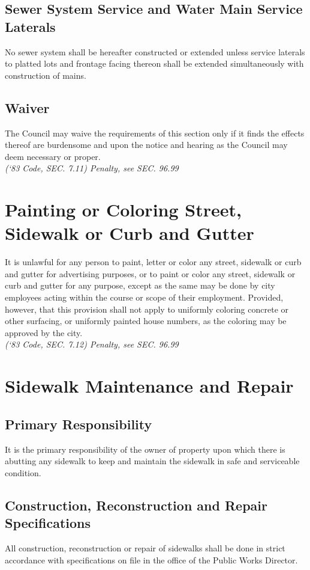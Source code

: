 \subsection{Sewer System Service and Water Main Service Laterals}
No sewer system shall be hereafter constructed or extended unless service laterals to platted lots and frontage facing thereon shall be extended simultaneously with construction of mains.
\subsection{Waiver}
The Council may waive the requirements of this section only if it finds the effects thereof are burdensome and upon the notice and hearing as the Council may deem necessary or proper.\\
\emph{(‘83 Code, SEC. 7.11)  Penalty, see SEC. 96.99}
\section{Painting or Coloring Street, Sidewalk or Curb and Gutter}
It is unlawful for any person to paint, letter or color any street, sidewalk or curb and gutter for advertising purposes, or to paint or color any street, sidewalk or curb and gutter for any purpose, except as the same may be done by city employees acting within the course or scope of their employment. Provided, however, that this provision shall not apply to uniformly coloring concrete or other surfacing, or uniformly painted house numbers, as the coloring may be approved by the city.\\
\emph{(‘83 Code, SEC. 7.12)  Penalty, see SEC. 96.99}
\section{Sidewalk Maintenance and Repair}
\subsection{Primary Responsibility}
It is the primary responsibility of the owner of property upon which there is abutting any sidewalk to keep and maintain the sidewalk in safe and serviceable condition.
\subsection{Construction, Reconstruction and Repair Specifications}
All construction, reconstruction or repair of sidewalks shall be done in strict accordance with specifications on file in the office of the Public Works Director.
